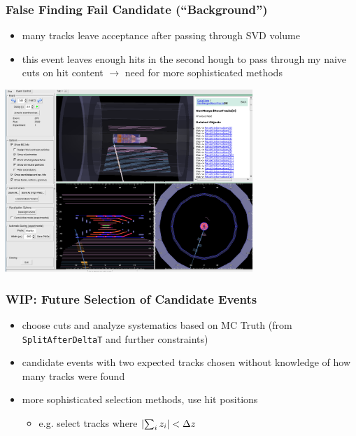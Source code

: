 \documentclass[18pt]{beamer}
\begin{document}
  \begin{frame}
    \frametitle{False Finding Fail Candidate (``Background'')}
    \begin{itemize}
    \item many tracks leave acceptance after passing through SVD volume
    \item this event leaves enough hits in the second hough to pass through my naive cuts on hit content $\rightarrow$ need for more sophisticated methods
    \end{itemize}
    \begin{center}
      \includegraphics[width=0.7\textwidth]{figures/b2display_example_bkgevt.png}
    \end{center}
  \end{frame}

  \begin{frame}
    \frametitle{WIP: Future Selection of Candidate Events}
    \begin{itemize}
    \item choose cuts and analyze systematics based on MC Truth (from \texttt{SplitAfterDeltaT} and further constraints)
    \item candidate events with two expected tracks chosen without knowledge of how many tracks were found
    \item more sophisticated selection methods, use hit positions
      \begin{itemize}
      \item e.g. select tracks where $\abs{\sum_i z_i} < \Delta z$
      \end{itemize}
    \end{itemize}
  \end{frame}
\end{document}

